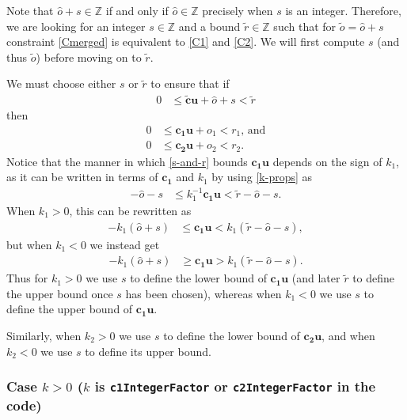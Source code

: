\documentclass[11pt]{article}
\newcommand{\vect}[1]{\mathbf{#1}}
\begin{document}
Note that $\widehat{o} + s \in \mathbb{Z}$ if and only if $\widehat{o} \in \mathbb{Z}$ precisely when $s$ is an integer. Therefore, we are looking for an integer $s\in \mathbb{Z}$ and a bound $\widetilde{r}\in \mathbb{Z}$ such that for $\widetilde{o} = \widehat{o} + s$ constraint \eqref{Cmerged} is equivalent to \eqref{C1} and \eqref{C2}. We will first compute $s$ (and thus $\widetilde{o}$) before moving on to $\widetilde{r}$.

We must choose either $s$ or $\widetilde{r}$ to ensure that if
\begin{align}
0 &\leq \widetilde{\vect{c}}\vect{u} + \widehat{o} + s < \widetilde{r} \label{s-and-r}
\end{align}
then
\begin{align*}
0 &\leq \vect{c_1}\vect{u} + o_1 < r_1\text{, and} \\
0 &\leq \vect{c_2}\vect{u} + o_2 < r_2.
\end{align*}
Notice that the manner in which \eqref{s-and-r} bounds $\vect{c_1}\vect{u}$ depends on the sign of $k_1$, as it can be written in terms of $\vect{c_1}$ and $k_1$ by using \eqref{k-props} as
\begin{align*}
-\widehat{o} - s &\leq k_1^{-1}\vect{c_1}\vect{u} < \widetilde{r} - \widehat{o} - s.
\end{align*}
When $k_1 > 0$, this can be rewritten as
\begin{align*}
-k_1(\widehat{o} + s) &\leq \vect{c_1}\vect{u} < k_1(\widetilde{r} - \widehat{o} - s),
\end{align*}
but when $k_1 < 0$ we instead get
\begin{align*}
-k_1(\widehat{o} + s) &\geq \vect{c_1}\vect{u} > k_1(\widetilde{r} - \widehat{o} - s).
\end{align*}
Thus for $k_1 > 0$ we use $s$ to define the lower bound of $\vect{c_1}\vect{u}$ (and later $\widetilde{r}$ to define the upper bound once $s$ has been chosen), whereas when $k_1 < 0$ we use $s$ to define the upper bound of $\vect{c_1}\vect{u}$.

Similarly, when $k_2 > 0$ we use $s$ to define the lower bound of $\vect{c_2}\vect{u}$, and when $k_2 < 0$ we use $s$ to define its upper bound.

\subsubsection{Case $k > 0$ ($k$ is \texttt{c1IntegerFactor} or \texttt{c2IntegerFactor} in the code)}
\end{document}
